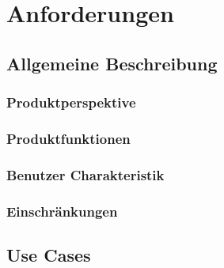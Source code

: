 \section{Anforderungen}

\subsection{Allgemeine Beschreibung}

\subsubsection{Produktperspektive}


\subsubsection{Produktfunktionen}


\subsubsection{Benutzer Charakteristik}


\subsubsection{Einschränkungen}



\subsection{Use Cases}


